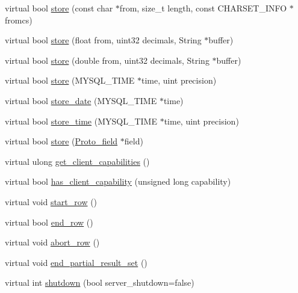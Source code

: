 \begin{DoxyCompactItemize}
virtual bool \mbox{\hyperlink{classProtocol__callback_a9dbe6210d73f4ef2ffb2aec2f98afe46}{store}} (const char $\ast$from, size\+\_\+t length, const C\+H\+A\+R\+S\+E\+T\+\_\+\+I\+N\+FO $\ast$fromcs)
\item 
virtual bool \mbox{\hyperlink{classProtocol__callback_a69c9a82e85379db7e421eb30f834021a}{store}} (float from, uint32 decimals, String $\ast$buffer)
\item 
virtual bool \mbox{\hyperlink{classProtocol__callback_afab07c98d8a6492cdc76795ba1badbdb}{store}} (double from, uint32 decimals, String $\ast$buffer)
\item 
virtual bool \mbox{\hyperlink{classProtocol__callback_aab3b4e68ed61a694f2a8c1e12a73827a}{store}} (M\+Y\+S\+Q\+L\+\_\+\+T\+I\+ME $\ast$time, uint precision)
\item 
virtual bool \mbox{\hyperlink{classProtocol__callback_a7cb123a81dfebaeccc0f38883a4ad539}{store\+\_\+date}} (M\+Y\+S\+Q\+L\+\_\+\+T\+I\+ME $\ast$time)
\item 
virtual bool \mbox{\hyperlink{classProtocol__callback_aa087cca583050f9985e9f7849a101eaf}{store\+\_\+time}} (M\+Y\+S\+Q\+L\+\_\+\+T\+I\+ME $\ast$time, uint precision)
\item 
virtual bool \mbox{\hyperlink{classProtocol__callback_a6df3f044f7dcab0886ba40625b018a27}{store}} (\mbox{\hyperlink{classProto__field}{Proto\+\_\+field}} $\ast$field)
\item 
virtual ulong \mbox{\hyperlink{classProtocol__callback_af675b178de4d07c875e50db63ce751e4}{get\+\_\+client\+\_\+capabilities}} ()
\item 
virtual bool \mbox{\hyperlink{classProtocol__callback_a576ec71a457f4b71c3be94b0b59e053b}{has\+\_\+client\+\_\+capability}} (unsigned long capability)
\item 
virtual void \mbox{\hyperlink{classProtocol__callback_a951efbe2b108b81630d827830f89b3d7}{start\+\_\+row}} ()
\item 
virtual bool \mbox{\hyperlink{classProtocol__callback_a192b3291bd670f6ae16118a9ae58c378}{end\+\_\+row}} ()
\item 
virtual void \mbox{\hyperlink{classProtocol__callback_a9cba9e2e3d01d53b45a874461970760e}{abort\+\_\+row}} ()
\item 
virtual void \mbox{\hyperlink{classProtocol__callback_a5991f22647e032d05be2cb72e81ce5b6}{end\+\_\+partial\+\_\+result\+\_\+set}} ()
\item 
virtual int \mbox{\hyperlink{classProtocol__callback_a787ca2bd8aea693536edcae3387b4798}{shutdown}} (bool server\+\_\+shutdown=false)

\end{DoxyCompactItemize}
